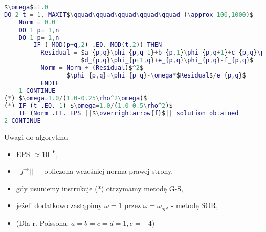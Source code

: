 \begin{frame}[fragile]{}
\begin{lstlisting}[language=Matlab, mathescape]
$\omega$=1.0
DO 2 t = 1, MAXIT$\qquad\qquad\qquad\qquad\qquad (\approx 100,1000)$
    Norm = 0.0
    DO 1 p= 1,n
    DO 1 p= 1,n
        IF ( MOD(p+q,2) .EQ. MOD(t,2)) THEN
          Residual = $a_{p,q}\phi_{p,q-1}+b_{p,1}\phi_{p,q+1}+c_{p,q}\phi_{p-1,q}+$
                     $d_{p,q}\phi_{p+1,q}+e_{p,q}\phi_{p,q}-f_{p,q}$
          Norm = Norm + (Residual)$^2$
                 $\phi_{p,q}=\phi_{p_q}-\omega*$Residual$/e_{p,q}$
          ENDIF
    1 CONTINUE
(*) $\omega=1.0/(1.0-0.25\rho^2\omega)$
(*) IF (t .EQ. 1) $\omega=1.0/(1.0-0.5\rho^2)$
    IF (Norm .LT. EPS ||$\overrightarrow{f}$|| solution obtained
2 CONTINUE
\end{lstlisting}
\end{frame}

\begin{frame}{}
  \begin{block}{Uwagi do algorytmu}
    \begin{itemize}
      \item EPS $\approx 10^{-6}$,
      \item $||f^\rightarrow|| -$ obliczona wcześniej norma prawej strony,
      \item gdy usuniemy instrukcje (*) otrzymamy metodę G-S,
      \item jeżeli dodatkowo zastąpimy $\omega=1$ przez $\omega=\omega_{opt}$ - metodę SOR,
      \item (Dla r. Poissona: $a=b=c=d=1, e=-4$)
    \end{itemize}
  \end{block}
\end{frame}



